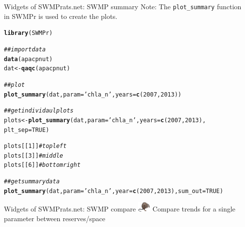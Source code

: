 \documentclass[xcolor=dvipsnames,serif]{beamer}\usepackage[]{graphicx}\usepackage[]{color}
\makeatletter
\newcommand{\hlnum}[1]{\textcolor[rgb]{0.686,0.059,0.569}{#1}}%
\newcommand{\hlstr}[1]{\textcolor[rgb]{0.192,0.494,0.8}{#1}}%
\newcommand{\hlcom}[1]{\textcolor[rgb]{0.678,0.584,0.686}{\textit{#1}}}%
\newcommand{\hlstd}[1]{\textcolor[rgb]{0.345,0.345,0.345}{#1}}%
\newcommand{\hlkwb}[1]{\textcolor[rgb]{0.69,0.353,0.396}{#1}}%
\newcommand{\hlkwc}[1]{\textcolor[rgb]{0.333,0.667,0.333}{#1}}%
\newcommand{\hlkwd}[1]{\textcolor[rgb]{0.737,0.353,0.396}{\textbf{#1}}}%
\newenvironment{kframe}{%
 \def\at@end@of@kframe{}%
 \ifinner\ifhmode%
  \def\at@end@of@kframe{\end{minipage}}%
  \begin{minipage}{\columnwidth}%
 \fi\fi%
 \def\FrameCommand##1{\hskip\@totalleftmargin \hskip-\fboxsep
 \colorbox{shadecolor}{##1}\hskip-\fboxsep
     \hskip-\linewidth \hskip-\@totalleftmargin \hskip\columnwidth}%
 \MakeFramed {\advance\hsize-\width
   \@totalleftmargin\z@ \linewidth\hsize
   \@setminipage}}%
 {\par\unskip\endMakeFramed%
 \at@end@of@kframe}
\newenvironment{knitrout}{}{} %
\makeatother
\begin{document}
\begin{frame}[fragile]{Widgets of SWMPrats.net: SWMP summary}
Note: The \texttt{plot\_summary} function in SWMPr is used to create the plots.
\begin{knitrout}\scriptsize
{}\color{fgcolor}\begin{kframe}
\begin{alltt}
\hlkwd{library}\hlstd{(SWMPr)}

\hlcom{## import data}
\hlkwd{data}\hlstd{(apacpnut)}
\hlstd{dat} \hlkwb{<-} \hlkwd{qaqc}\hlstd{(apacpnut)}

\hlcom{## plot}
\hlkwd{plot_summary}\hlstd{(dat,} \hlkwc{param} \hlstd{=} \hlstr{'chla_n'}\hlstd{,} \hlkwc{years} \hlstd{=} \hlkwd{c}\hlstd{(}\hlnum{2007}\hlstd{,} \hlnum{2013}\hlstd{))}

\hlcom{## get individaul plots}
\hlstd{plots} \hlkwb{<-} \hlkwd{plot_summary}\hlstd{(dat,} \hlkwc{param} \hlstd{=} \hlstr{'chla_n'}\hlstd{,} \hlkwc{years} \hlstd{=} \hlkwd{c}\hlstd{(}\hlnum{2007}\hlstd{,} \hlnum{2013}\hlstd{),}
  \hlkwc{plt_sep} \hlstd{=} \hlnum{TRUE}\hlstd{)}

\hlstd{plots[[}\hlnum{1}\hlstd{]]} \hlcom{# top left}
\hlstd{plots[[}\hlnum{3}\hlstd{]]} \hlcom{# middle}
\hlstd{plots[[}\hlnum{6}\hlstd{]]} \hlcom{# bottom right}

\hlcom{## get summary data}
\hlkwd{plot_summary}\hlstd{(dat,} \hlkwc{param} \hlstd{=} \hlstr{'chla_n'}\hlstd{,} \hlkwc{year} \hlstd{=} \hlkwd{c}\hlstd{(}\hlnum{2007}\hlstd{,} \hlnum{2013}\hlstd{),} \hlkwc{sum_out} \hlstd{=} \hlnum{TRUE}\hlstd{)}
\end{alltt}
\end{kframe}
\end{knitrout}
\end{frame}

\begin{frame}{Widgets of SWMPrats.net: SWMP compare}
\includegraphics[width = 0.05\textwidth]{imgs/swmprat.png}  Compare trends for a single parameter between reserves/space
\centerline{}
\end{frame}
\end{document}
